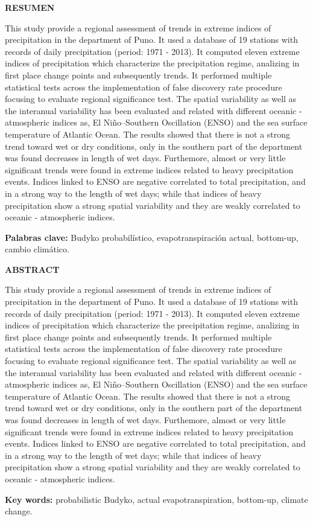 \begin{center}
\large{\textbf {RESUMEN}}
\end{center}

This study provide a regional assessment of trends in extreme indices of precipitation in the department of Puno. It used a database of 19 stations with records of daily precipitation (period: 1971 - 2013). It computed eleven extreme indices of precipitation which characterize the precipitation regime, analizing in first place change points and subsequently trends. It performed multiple statistical tests across the implementation of false discovery rate procedure focusing to evaluate regional significance test. The spatial variability as well as the interanual variability has been evaluated and related with different oceanic - atmospheric indices as, El Niño–Southern Oscillation (ENSO) and the sea surface temperature of Atlantic Ocean. The results showed that there is not a strong trend toward wet or dry conditions, only in the southern part of the department was found decreases in length of wet days. Furthemore, almost or very little significant trends were found in extreme indices related to heavy precipitation events. Indices linked to ENSO are negative correlated to total precipitation, and in a strong way to the length of wet days; while that indices of heavy precipitation show a strong spatial variability and they are weakly correlated to oceanic - atmospheric indices.

\textbf {Palabras clave:} Budyko probabilístico, evapotranspiración actual, bottom-up, cambio climático.

\clearpage

\begin{center}
\large{\textbf {ABSTRACT}}
\end{center}

This study provide a regional assessment of trends in extreme indices of precipitation in the department of Puno. It used a database of 19 stations with records of daily precipitation (period: 1971 - 2013). It computed eleven extreme indices of precipitation which characterize the precipitation regime, analizing in first place change points and subsequently trends. It performed multiple statistical tests across the implementation of false discovery rate procedure focusing to evaluate regional significance test. The spatial variability as well as the interanual variability has been evaluated and related with different oceanic - atmospheric indices as, El Niño–Southern Oscillation (ENSO) and the sea surface temperature of Atlantic Ocean. The results showed that there is not a strong trend toward wet or dry conditions, only in the southern part of the department was found decreases in length of wet days. Furthemore, almost or very little significant trends were found in extreme indices related to heavy precipitation events. Indices linked to ENSO are negative correlated to total precipitation, and in a strong way to the length of wet days; while that indices of heavy precipitation show a strong spatial variability and they are weakly correlated to oceanic - atmospheric indices.

\textbf {Key words:} probabilistic Budyko, actual evapotranspiration, bottom-up, climate change.

\clearpage